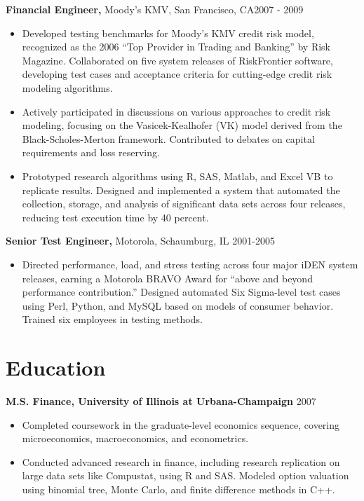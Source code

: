 \documentclass[11pt,]{article}
\providecommand{\tightlist}{%
  \setlength{\itemsep}{0pt}\setlength{\parskip}{0pt}}
\begin{document}
\textbf{Financial Engineer,} Moody's KMV, San Francisco, CA\hfill 2007 -
2009

\begin{itemize}
\item
  Developed testing benchmarks for Moody's KMV credit risk model,
  recognized as the 2006 ``Top Provider in Trading and Banking'' by Risk
  Magazine. Collaborated on five system releases of RiskFrontier
  software, developing test cases and acceptance criteria for
  cutting-edge credit risk modeling algorithms.
\item
  Actively participated in discussions on various approaches to credit
  risk modeling, focusing on the Vasicek-Kealhofer (VK) model derived
  from the Black-Scholes-Merton framework. Contributed to debates on
  capital requirements and loss reserving.
\item
  Prototyped research algorithms using R, SAS, Matlab, and Excel VB to
  replicate results. Designed and implemented a system that automated
  the collection, storage, and analysis of significant data sets across
  four releases, reducing test execution time by 40 percent.
\end{itemize}

\textbf{Senior Test Engineer,} Motorola, Schaumburg, IL \hfill 2001-2005

\begin{itemize}
\tightlist
\item
  Directed performance, load, and stress testing across four major iDEN
  system releases, earning a Motorola BRAVO Award for ``above and beyond
  performance contribution.'' Designed automated Six Sigma-level test
  cases using Perl, Python, and MySQL based on models of consumer
  behavior. Trained six employees in testing methods.
\end{itemize}

\section{Education}\label{education}

\textbf{M.S. Finance, University of Illinois at Urbana-Champaign}
\hfill 2007

\begin{itemize}
\item
  Completed coursework in the graduate-level economics sequence,
  covering microeconomics, macroeconomics, and econometrics.
\item
  Conducted advanced research in finance, including research replication
  on large data sets like Compustat, using R and SAS. Modeled option
  valuation using binomial tree, Monte Carlo, and finite difference
  methods in C++.
\end{itemize}
\end{document}
